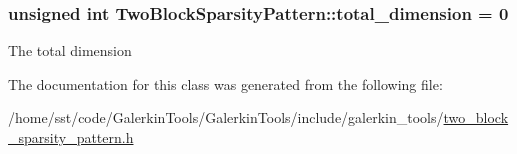 \subsubsection[{\texorpdfstring{total\+\_\+dimension}{total_dimension}}]{\setlength{\rightskip}{0pt plus 5cm}unsigned int Two\+Block\+Sparsity\+Pattern\+::total\+\_\+dimension = 0\hspace{0.3cm}{\ttfamily [private]}}\hypertarget{class_two_block_sparsity_pattern_aa560457e8b8bf7a06acf6b19987c5ee0}{}\label{class_two_block_sparsity_pattern_aa560457e8b8bf7a06acf6b19987c5ee0}
The total dimension 

The documentation for this class was generated from the following file\+:\begin{DoxyCompactItemize}
\item 
/home/sst/code/\+Galerkin\+Tools/\+Galerkin\+Tools/include/galerkin\+\_\+tools/\hyperlink{two__block__sparsity__pattern_8h}{two\+\_\+block\+\_\+sparsity\+\_\+pattern.\+h}\end{DoxyCompactItemize}
